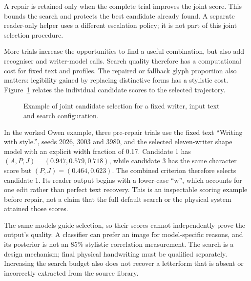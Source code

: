 A repair is retained only when the complete trial improves the joint score. This bounds the search and protects the best candidate already found. A separate reader-only helper uses a different escalation policy; it is not part of this joint selection procedure.~\cite[style.py; synthesise.py]{braunepipeline2026}


More trials increase the opportunities to find a useful combination, but also add recogniser and writer-model calls. Search quality therefore has a computational cost for fixed text and profiles. The repaired or fallback glyph proportion also matters: legibility gained by replacing distinctive forms has a stylistic cost. Figure~\ref{fig:des-candidates} relates the individual candidate scores to the selected trajectory.~\cite[style.py; synthesise.py]{braunepipeline2026}


\begin{figure}[!htbp]\centering
{}
\caption{Example of joint candidate selection for a fixed writer, input text and search configuration.~\cite{brauneevidence2026,braunepipeline2026}}
\label{fig:des-candidates}
\end{figure}

In the worked Owen example, three pre-repair trials use the fixed text ``Writing with style.'', seeds 2026, 3003 and 3980, and the selected eleven-writer shape model with an explicit width fraction of 0.17. Candidate 1 has $(A,P,J)=(0.947,0.579,0.718)$, while candidate 3 has the same character score but $(P,J)=(0.464,0.623)$. The combined criterion therefore selects candidate 1. Its reader output begins with a lower-case ``w'', which accounts for one edit rather than perfect text recovery. This is an inspectable scoring example before repair, not a claim that the full default search or the physical system attained those scores.~\cite[style.py; synthesise.py; reproduce.py]{braunepipeline2026}

The same models guide selection, so their scores cannot independently prove the output's quality. A classifier can prefer an image for model-specific reasons, and its posterior is not an 85\% stylistic correlation measurement. The search is a design mechanism; final physical handwriting must be qualified separately. Increasing the search budget also does not recover a letterform that is absent or incorrectly extracted from the source library.~\cite[style.py; synthesise.py; reproduce.py]{braunepipeline2026}

